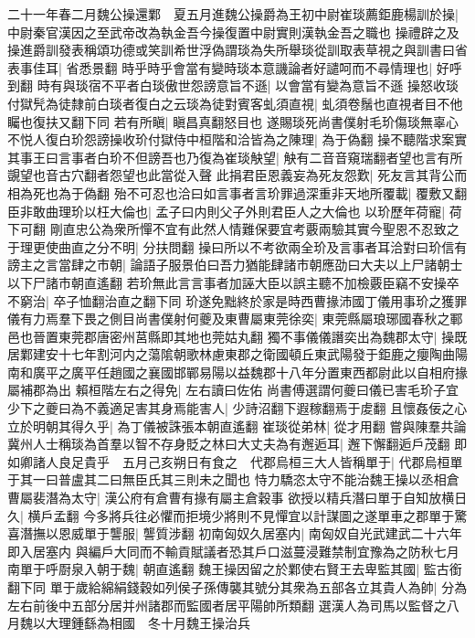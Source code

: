 二十一年春二月魏公操還鄴　夏五月進魏公操爵為王初中尉崔琰薦鉅鹿楊訓於操|{
	中尉秦官漢因之至武帝改為執金吾今操復置中尉實則漢執金吾之職也}
操禮辟之及操進爵訓發表稱頌功德或笑訓希世浮偽謂琰為失所舉琰從訓取表草視之與訓書曰省表事佳耳|{
	省悉景翻}
時乎時乎會當有變時琰本意譏論者好譴呵而不尋情理也|{
	好呼到翻}
時有與琰宿不平者白琰傲世怨謗意旨不遜|{
	以會當有變為意旨不遜}
操怒收琰付獄髠為徒隸前白琰者復白之云琰為徒對賓客虬須直視|{
	虬須卷鬚也直視者目不他矚也復扶又翻下同}
若有所瞋|{
	瞋昌真翻怒目也}
遂賜琰死尚書僕射毛玠傷琰無辜心不悦人復白玠怨謗操收玠付獄侍中桓階和洽皆為之陳理|{
	為于偽翻}
操不聽階求案實其事王曰言事者白玠不但謗吾也乃復為崔琰觖望|{
	觖有二音音窺瑞翻者望也言有所覬望也音古穴翻者怨望也此當從入聲}
此捐君臣恩義妄為死友怨歎|{
	死友言其背公而相為死也為于偽翻}
殆不可忍也洽曰如言事者言玠罪過深重非天地所覆載|{
	覆敷又翻}
臣非敢曲理玠以枉大倫也|{
	孟子曰内則父子外則君臣人之大倫也}
以玠歷年荷寵|{
	荷下可翻}
剛直忠公為衆所憚不宜有此然人情難保要宜考覈兩驗其實今聖恩不忍致之于理更使曲直之分不明|{
	分扶問翻}
操曰所以不考欲兩全玠及言事者耳洽對曰玠信有謗主之言當肆之市朝|{
	論語子服景伯曰吾力猶能肆諸市朝應劭曰大夫以上尸諸朝士以下尸諸市朝直遙翻}
若玠無此言言事者加誣大臣以誤主聽不加檢覈臣竊不安操卒不窮治|{
	卒子恤翻治直之翻下同}
玠遂免黜終於家是時西曹掾沛國丁儀用事玠之獲罪儀有力焉羣下畏之側目尚書僕射何夔及東曹屬東莞徐奕|{
	東莞縣屬琅琊國春秋之鄆邑也晉置東莞郡唐密州莒縣即其地也莞姑丸翻}
獨不事儀儀譖奕出為魏郡太守|{
	操既居鄴建安十七年割河内之蕩隂朝歌林慮東郡之衛國頓丘東武陽發于鉅鹿之癭陶曲陽南和廣平之廣平任趙國之襄國邯鄲易陽以益魏郡十八年分置東西都尉此以自相府掾屬補郡為出}
賴桓階左右之得免|{
	左右讀曰佐佑}
尚書傅選謂何夔曰儀已害毛玠子宜少下之夔曰為不義適足害其身焉能害人|{
	少詩沼翻下遐稼翻焉于䖍翻}
且懷姦佞之心立於明朝其得久乎|{
	為丁儀被誅張本朝直遙翻}
崔琰從弟林|{
	從才用翻}
嘗與陳羣共論冀州人士稱琰為首羣以智不存身貶之林曰大丈夫為有邂逅耳|{
	邂下懈翻逅戶茂翻}
即如卿諸人良足貴乎　五月己亥朔日有食之　代郡烏桓三大人皆稱單于|{
	代郡烏桓單于其一曰普盧其二曰無臣氏其三則未之聞也}
恃力驕恣太守不能治魏王操以丞相倉曹屬裴潛為太守|{
	漢公府有倉曹有掾有屬主倉穀事}
欲授以精兵潛曰單于自知放横日久|{
	横戶孟翻}
今多將兵往必懼而拒境少將則不見憚宜以計謀圖之遂單車之郡單于驚喜潛撫以恩威單于讋服|{
	讋質涉翻}
初南匈奴久居塞内|{
	南匈奴自光武建武二十六年即入居塞内}
與編戶大同而不輸貢賦議者恐其戶口滋蔓浸難禁制宜豫為之防秋七月南單于呼㕑泉入朝于魏|{
	朝直遙翻}
魏王操因留之於鄴使右賢王去卑監其國|{
	監古銜翻下同}
單于歲給綿絹錢穀如列侯子孫傳襲其號分其衆為五部各立其貴人為帥|{
	分為左右前後中五部分居并州諸郡而監國者居平陽帥所類翻}
選漢人為司馬以監督之八月魏以大理鍾繇為相國　冬十月魏王操治兵

